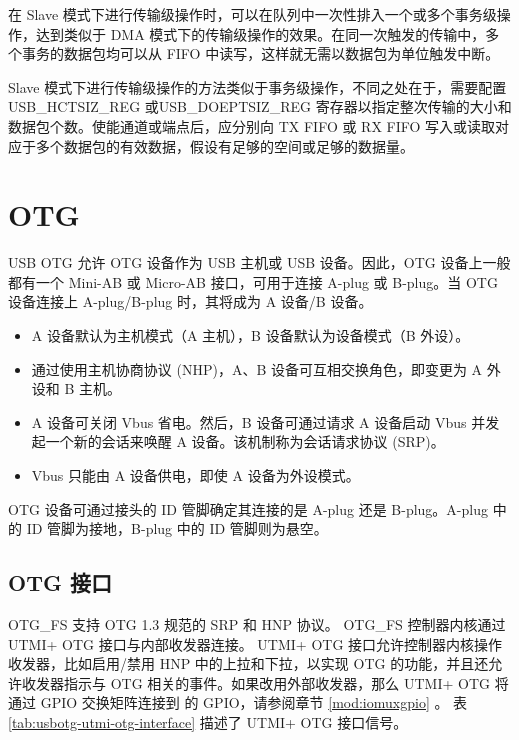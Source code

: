 \documentclass[main\_\_CN.tex]{subfiles}
\begin{document}
在 Slave 模式下进行传输级操作时，可以在队列中一次性排入一个或多个事务级操作，达到类似于 DMA 模式下的传输级操作的效果。在同一次触发的传输中，多个事务的数据包均可以从 FIFO 中读写，这样就无需以数据包为单位触发中断。

 Slave 模式下进行传输级操作的方法类似于事务级操作，不同之处在于，需要配置 USB\_HCTSIZ\_REG 或USB\_DOEPTSIZ\_REG 寄存器以指定整次传输的大小和数据包个数。使能通道或端点后，应分别向 TX FIFO 或 RX FIFO 写入或读取对应于多个数据包的有效数据，假设有足够的空间或足够的数据量。

\section{OTG}

USB OTG 允许 OTG 设备作为 USB 主机或 USB 设备。因此，OTG 设备上一般都有一个 Mini-AB 或 Micro-AB 接口，可用于连接 A-plug 或 B-plug。当 OTG 设备连接上 A-plug/B-plug 时，其将成为 A 设备/B 设备。

\begin{itemize}
    \item A 设备默认为主机模式（A 主机），B 设备默认为设备模式（B 外设）。
    \item 通过使用主机协商协议 (NHP)，A、B 设备可互相交换角色，即变更为 A 外设和 B 主机。
    \item A 设备可关闭 Vbus 省电。然后，B 设备可通过请求 A 设备启动 Vbus 并发起一个新的会话来唤醒 A 设备。该机制称为会话请求协议 (SRP)。
    \item Vbus 只能由 A 设备供电，即使 A 设备为外设模式。
\end{itemize}

OTG 设备可通过接头的 ID 管脚确定其连接的是 A-plug 还是 B-plug。A-plug 中的 ID 管脚为接地，B-plug 中的 ID 管脚则为悬空。

\subsection{OTG 接口}

OTG\_FS 支持 OTG 1.3 规范的 SRP 和 HNP 协议。 OTG\_FS 控制器内核通过 UTMI+ OTG 接口与内部收发器连接。 UTMI+ OTG 接口允许控制器内核操作收发器，比如启用/禁用 HNP 中的上拉和下拉，以实现 OTG 的功能，并且还允许收发器指示与 OTG 相关的事件。如果改用外部收发器，那么 UTMI+ OTG 将通过 GPIO 交换矩阵连接到 \chipname{} 的 GPIO，请参阅章节 \ref{mod:iomuxgpio} \textit{}。 表 \ref{tab:usbotg-utmi-otg-interface} 描述了 UTMI+ OTG 接口信号。


\end{document}
